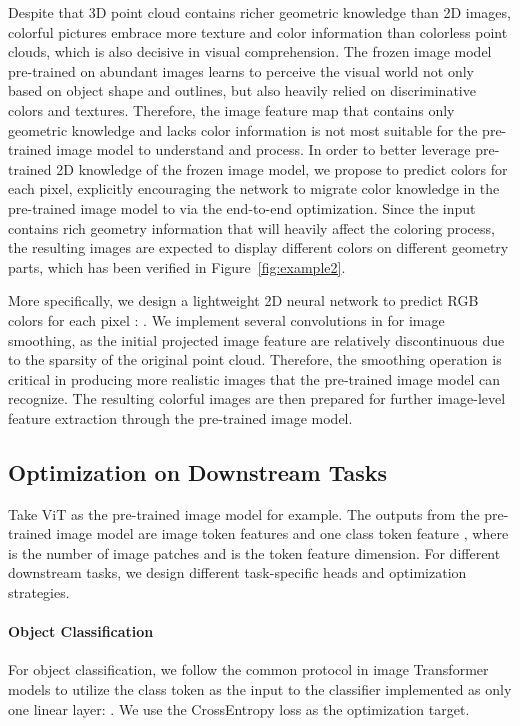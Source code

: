 \documentclass{article}
\begin{document}
Despite that 3D point cloud contains richer geometric knowledge than 2D images, colorful pictures embrace more texture and color information than colorless point clouds, which is also decisive in visual comprehension. The frozen image model pre-trained on abundant images learns to perceive the visual world not only based on object shape and outlines, but also heavily relied on discriminative colors and textures. Therefore, the image feature map  that contains only geometric knowledge and lacks color information is not most suitable for the pre-trained image model to understand and process. In order to better leverage pre-trained 2D knowledge of the frozen image model, we propose to predict colors for each pixel, explicitly encouraging the network to migrate color knowledge in the pre-trained image model to  via the end-to-end optimization. Since the input  contains rich geometry information that will heavily affect the coloring process, the resulting images are expected to display different colors on different geometry parts, which has been verified in Figure~\ref{fig:example2}. 


More specifically, we design a lightweight 2D neural network  to predict RGB colors  for each pixel : . We implement several  convolutions in  for image smoothing, as the initial projected image feature  are relatively discontinuous due to the sparsity of the original point cloud. Therefore, the smoothing operation is critical in producing more realistic images that the pre-trained image model can recognize.
The resulting colorful images are then prepared for further image-level feature extraction through the pre-trained image model.


\subsection{Optimization on Downstream Tasks}

Take ViT as the pre-trained image model for example. The outputs from the pre-trained image model are image token features  and one class token feature , where  is the number of image patches and  is the token feature dimension. For different downstream tasks, we design different task-specific heads and optimization strategies.

\paragraph{Object Classification}

For object classification, we follow the common protocol in image Transformer models to utilize the class token  as the input to the classifier  implemented as only one linear layer: . We use the CrossEntropy loss as the optimization target.
\end{document}

